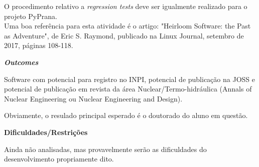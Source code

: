 O procedimento relativo a \textit{regression tests} deve ser igualmente realizado para 
o projeto PyPrana.\\

Uma boa referência para esta atividade é o artigo: "Heirloom Software: the Past as Adventure", de Eric S. Raymond, 
publicado na Linux Journal, setembro de 2017, páginas 108-118.

\textbf{\textit{Outcomes}}

Software com potencial para registro no INPI, potencial de publicação na JOSS e 
potencial de publicação em revista da área Nuclear/Termo-hidráulica (Annals of 
Nuclear Engineering ou Nuclear Engineering and Design).

Obviamente, o resulado principal esperado é o doutorado do aluno em questão.

\textbf{Dificuldades/Restrições}

Ainda não analisadas, mas provavelmente serão as dificuldades do desenvolvimento 
propriamente dito.

